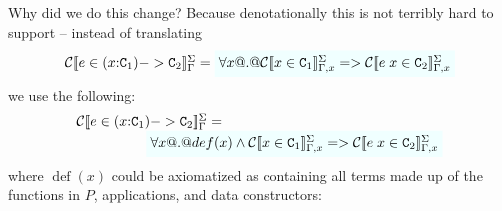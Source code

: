\documentclass[preprint,nocopyrightspace,draft]{sigplanconf}
\begin{document}
\newcommand{\definable}[1]{{\mathop{def}}(#1)}

Why did we do this change? Because denotationally this is not terribly hard to support -- instead of translating 
\[\begin{array}{l}
  \ctrans{\Sigma}{\Gamma}{e \in (x{:}\Ct_1) -> \Ct_2} =  
  \formula{\forall x @.@ \ctrans{\Sigma}{\Gamma,x}{x \in \Ct_1} => \ctrans{\Sigma}{\Gamma,x}{e\;x \in \Ct_2}}
\end{array}\] 
we use the following:
\[\begin{array}{l}
  \ctrans{\Sigma}{\Gamma}{e \in (x{:}\Ct_1) -> \Ct_2} = \\ 
  \qquad\qquad\quad 
\formula{\forall x @.@ \definable{x} \land \ctrans{\Sigma}{\Gamma,x}{x \in \Ct_1} => \ctrans{\Sigma}{\Gamma,x}{e\;x \in \Ct_2}}
\end{array}\] 
where $\definable{x}$ could be axiomatized as containing all terms 
made up of the functions in $P$, applications, and data constructors:
\end{document}
